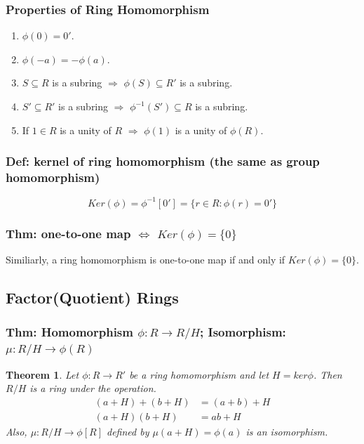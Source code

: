 \documentclass[11pt,a4paper]{article}
\newtheorem{theorem}{Theorem}
\begin{document}
\subsubsection{Properties of Ring Homomorphism}
\begin{enumerate}
    \item $\phi(0)=0'$.
    \item $\phi(-a)=-\phi(a)$.
    \item $S\subseteq R$ is a subring $\Rightarrow$ $\phi(S)\subseteq R'$ is a subring.
    \item $S'\subseteq R'$ is a subring $\Rightarrow$ $\phi^{-1}(S')\subseteq R$ is a subring.
    \item If $1\in R$ is a unity of $R$ $\Rightarrow$ $\phi(1)$ is a unity of $\phi(R)$.
\end{enumerate}

\subsubsection{Def: kernel of ring homomorphism (the same as group homomorphism)}
$$Ker(\phi)=\phi^{-1}[0']=\{r\in R: \phi(r)=0'\}$$

\subsubsection{Thm: one-to-one map $\Leftrightarrow$ $Ker(\phi)=\{0\}$}
Similiarly, a ring homomorphism is one-to-one map if and only if $Ker(\phi)=\{0\}$.

\subsection{Factor(Quotient) Rings}
\subsubsection{Thm: Homomorphism $\phi:R \rightarrow R/H$; Isomorphism: $\mu: R/H \rightarrow	\phi(R)$}
\begin{theorem}
    Let $\phi: R \rightarrow R'$ be a ring homomorphism and let $H=ker\phi$. Then $R/H$ is a ring under the operation.
    \begin{equation}
        \begin{aligned}
            (a+H)+(b+H)&=(a+b)+H\\
            (a+H)(b+H)&=ab+H
        \end{aligned}
        \nonumber
    \end{equation}
    Also, $\mu: R/H \rightarrow	\phi[R]$ defined by $\mu(a+H)=\phi(a)$ is an isomorphism.
\end{theorem}
\end{document}
